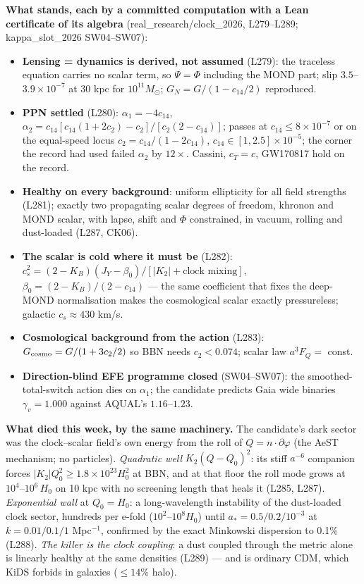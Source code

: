 \documentclass[10pt]{article}
\begin{document}
\textbf{What stands, each by a committed computation with a Lean certificate of its algebra} (real\_research/clock\_2026, L279--L289; kappa\_slot\_2026 SW04--SW07):
\begin{itemize}
\item \textbf{Lensing = dynamics is derived, not assumed} (L279): the traceless equation carries no scalar term, so $\Psi=\Phi$ including the MOND part; slip $3.5$--$3.9\times10^{-7}$ at 30 kpc for $10^{11}M_\odot$; $G_N=G/(1-c_{14}/2)$ reproduced.
\item \textbf{PPN settled} (L280): $\alpha_1=-4c_{14}$, $\alpha_2=c_{14}[c_{14}(1+2c_2)-c_2]/[c_2(2-c_{14})]$; passes at $c_{14}\le8\times10^{-7}$ or on the equal-speed locus $c_2=c_{14}/(1-2c_{14})$, $c_{14}\in[1,2.5]\times10^{-5}$; the corner the record had used failed $\alpha_2$ by $12\times$. Cassini, $c_T=c$, GW170817 hold on the record.
\item \textbf{Healthy on every background}: uniform ellipticity for all field strengths (L281); exactly two propagating scalar degrees of freedom, khronon and MOND scalar, with lapse, shift and $\Phi$ constrained, in vacuum, rolling and dust-loaded (L287, CK06).
\item \textbf{The scalar is cold where it must be} (L282): $c_s^2=(2-K_B)(J_Y-\beta_0)/[|K_2|+\text{clock mixing}]$, $\beta_0=(2-K_B)/(2-c_{14})$ --- the same coefficient that fixes the deep-MOND normalisation makes the cosmological scalar exactly pressureless; galactic $c_s\approx430$ km/s.
\item \textbf{Cosmological background from the action} (L283): $G_{\rm cosmo}=G/(1+3c_2/2)$ so BBN needs $c_2<0.074$; scalar law $a^3F_Q=$ const.
\item \textbf{Direction-blind EFE programme closed} (SW04--SW07): the smoothed-total-switch action dies on $\alpha_1$; the candidate predicts Gaia wide binaries $\gamma_v=1.000$ against AQUAL's $1.16$--$1.23$.
\end{itemize}

\textbf{What died this week, by the same machinery.} The candidate's dark sector was the clock--scalar field's own energy from the roll of $Q=n\!\cdot\!\partial\varphi$ (the AeST mechanism; no particles). \emph{Quadratic well} $K_2(Q-Q_0)^2$: its stiff $a^{-6}$ companion forces $|K_2|Q_0^2\ge1.8\times10^{23}H_0^2$ at BBN, and at that floor the roll mode grows at $10^4$--$10^6\,H_0$ on 10 kpc with no screening length that heals it (L285, L287). \emph{Exponential wall} at $Q_0=H_0$: a long-wavelength instability of the dust-loaded clock sector, hundreds per e-fold ($10^2$--$10^8H_0$) until $a_*=0.5/0.2/10^{-3}$ at $k=0.01/0.1/1$ Mpc$^{-1}$, confirmed by the exact Minkowski dispersion to 0.1\% (L288). \emph{The killer is the clock coupling}: a dust coupled through the metric alone is linearly healthy at the same densities (L289) --- and is ordinary CDM, which KiDS forbids in galaxies ($\le14\%$ halo).
\end{document}
